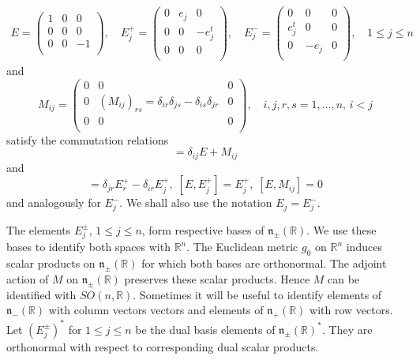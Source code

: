 \documentclass[a4paper,12pt,reqno]{amsart}
\numberwithin{theorem}{subsection}
\numberwithin{equation}{section}
\begin{document}
\begin{align*}
   E = \begin{pmatrix}
           1 & 0 & 0\\
           0 & 0 & 0\\
           0 & 0 & -1\\
          \end{pmatrix},\quad
   E_j^+ = \begin{pmatrix}
              0 & e_j  & 0\\
              0 & 0 & -e_j^t\\
              0 & 0 & 0\\
             \end{pmatrix},\quad
   E_j^- = \begin{pmatrix}
                        0 & 0  & 0\\
                        e_j^t & 0 & 0\\
                        0 & -e_j & 0\\
        \end{pmatrix}, \quad 1 \le j \le n \nonumber
\end{align*}
and
$$
   M_{ij} = \begin{pmatrix}
                    0 & 0  & 0\\
                    0 & {(M_{ij})_{rs}}=\delta_{ir}\delta_{js}-\delta_{is}\delta_{jr}& 0\\
                    0 & 0 & 0\\
         \end{pmatrix}, \quad i,j,r,s=1, \dots ,n,\, i<j
$$
satisfy the commutation relations
\begin{equation*}
   [E_i^+,E_j^-] = \delta_{ij} E + M_{ij}
\end{equation*}
and
\begin{equation*}
   [M_{ij},E_r^+] = \delta_{jr} E_r^+ - \delta_{ir} E_j^+,\; [E,E_j^+] = E_j^+, \; [E,M_{ij}] = 0
\end{equation*}
and analogously for $E^-_j$. We shall also use the notation $E_j = E_j^-$.

The elements $E_j^\pm$, $1 \le j \le n$, form respective bases of
${{\mathfrak n}}_\pm({\mathbb{R}})$. We use these bases to identify both spaces with ${\mathbb{R}}^n$. The
Euclidean metric $g_0$ on ${\mathbb{R}}^n$ induces scalar products on ${{\mathfrak n}}_\pm({\mathbb{R}})$ for
which both bases are orthonormal. The adjoint action of $M$ on ${{\mathfrak n}}_\pm({\mathbb{R}})$
preserves these scalar products. Hence $M$ can be identified with $SO(n,{\mathbb{R}})$.
Sometimes it will be useful to identify elements of ${{\mathfrak n}}_-({\mathbb{R}})$ with column
vectors vectors and elements of ${{\mathfrak n}}_+({\mathbb{R}})$ with row vectors. Let
$(E_j^\pm)^*$ for $1 \le j \le n$ be the dual basis elements of
${{\mathfrak n}}_\pm({\mathbb{R}})^*$. They are orthonormal with respect to corresponding dual
scalar products.
\end{document}

